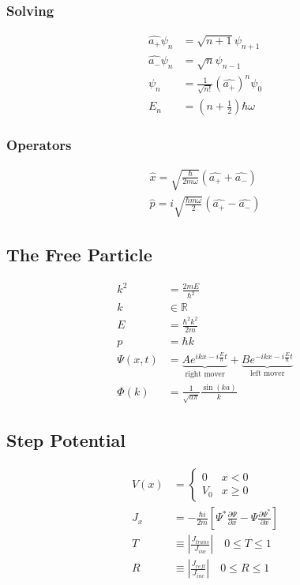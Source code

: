 \documentclass[8pt]{amsart}
\newcommand{\pder}[2][]{\frac{\partial#1}{\partial#2}}
\newcommand{\R}{\mathbb{R}}
\begin{document}
\begin{multicols}{3}
\subsubsection{Solving}%
\label{ssub:solving}

\begin{align*}
  \hat{a_{+}}\psi_n&=\sqrt{n+1}\psi_{n+1}\\
  \hat{a_{-}}\psi_n&=\sqrt{n}\psi_{n-1}\\
  \psi_n&=\frac{1}{\sqrt{n!}}{\left(\hat{a_{+}}\right)}^n\psi_0\\
  E_n&=\left(n+\frac{1}{2}\right)\hbar\omega
\end{align*}

\subsubsection{Operators}%
\label{ssub:operators}

\begin{align*}
  \hat{x}=\sqrt{\frac{\hbar}{2m\omega}}\left(\hat{a_{+}}+\hat{a_{-}}\right)\\
  \hat{p}=i\sqrt{\frac{\hbar m \omega}{2}}\left(\hat{a_{+}}-\hat{a_{-}}\right)
\end{align*}

\subsection{The Free Particle}%
\label{sub:the_free_particle}

\begin{align*}
  k^2&=\frac{2mE}{\hbar^2}\\
  k&\in\R\\
  E&=\frac{\hbar^2k^2}{2m}\\
  p&=\hbar k\\
  \Psi(x,t)&=\underbrace{Ae^{ikx-i\frac{E}{\hbar}t}}_\text{right
  mover}+\underbrace{Be^{-ikx-i\frac{E}{\hbar}t}}_\text{left mover}\\
    \Phi(k)&=\frac{1}{\sqrt{a\pi}}\frac{\sin(ka)}{k}
\end{align*}

\subsection{Step Potential}%
\label{sub:step_potential}

\begin{align*}
  V(x)&=\begin{cases}
    0 & x<0\\
    V_0 & x \geq 0
  \end{cases}\\
  J_x&=-\frac{\hbar i}{2m}\left[\Psi^*\pder[\Psi]{x}-\Psi\pder[\Psi^*]{x}\right]\\
  T&\equiv\left|\frac{J_{trans}}{J_{inc}}\right|\quad 0\leq T\leq 1\\
  R&\equiv\left|\frac{J_{refl}}{J_{inc}}\right|\quad 0\leq R\leq 1
\end{align*}


\end{multicols}
\end{document}
